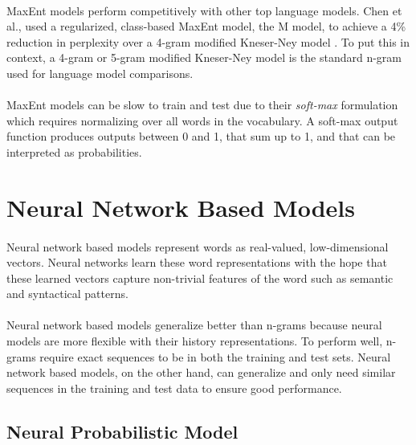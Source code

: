 \paragraph{}
MaxEnt models perform competitively with other top language models. Chen et al., used a regularized, class-based MaxEnt model, the M model, to achieve a 4\% reduction in perplexity over a 4-gram modified Kneser-Ney model \cite{Chen2009}. To put this in context, a 4-gram or 5-gram modified Kneser-Ney model is the standard n-gram used for language model comparisons.
\paragraph{}

MaxEnt models can be slow to train and test due to their \emph{soft-max} formulation which requires normalizing over all words in the vocabulary. A soft-max output function produces outputs between 0 and 1, that sum up to 1, and that can be interpreted as probabilities. 

\section{Neural Network Based Models} \label{sec:nplm}
\paragraph{}
Neural network based models represent words as real-valued, low-dimensional vectors. Neural networks learn these word representations with the hope that these learned vectors capture non-trivial features of the word such as semantic and syntactical patterns.
\paragraph{}
Neural network based models generalize better than n-grams because neural models are more flexible with their history representations. To perform well, n-grams require exact sequences to be in both the training and test sets. Neural network based models, on the other hand, can generalize and only need similar sequences in the training and test data to ensure good performance.

\subsection{Neural Probabilistic Model}
